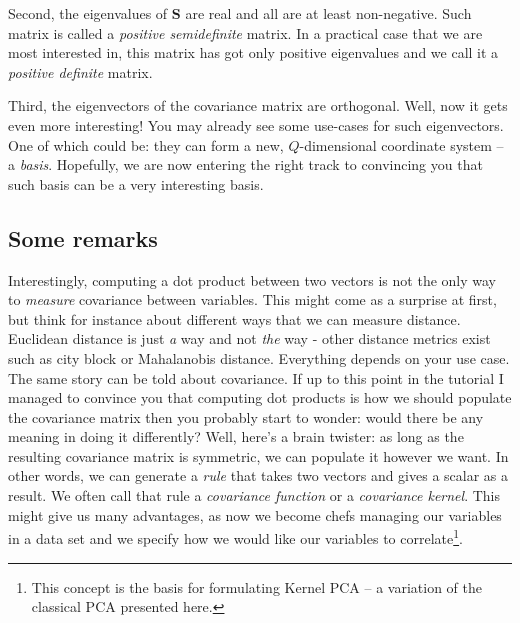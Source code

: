 \documentclass[10pt,twocolumn]{article}
\begin{document}
Second, the eigenvalues of $\mathbf{S}$ are real and all are at least non-negative. Such matrix is called a \textit{positive semidefinite} matrix. In a practical case that we are most interested in, this matrix has got only positive eigenvalues and we call it a \textit{positive definite} matrix.

Third, the eigenvectors of the covariance matrix are orthogonal. Well, now it gets even more interesting! You may already see some use-cases for such eigenvectors. One of which could be: they can form a new, $Q$-dimensional coordinate system -- a \textit{basis}. 
Hopefully, we are now entering the right track to convincing you that such basis can be a very interesting basis.


\subsection{Some remarks}

Interestingly, computing a dot product between two vectors is not the only way to \textit{measure} covariance between variables. This might come as a surprise at first, but think for instance about different ways that we can measure distance. Euclidean distance is just \textit{a} way and not \textit{the} way - other distance metrics exist such as city block or Mahalanobis distance. Everything depends on your use case. The same story can be told about covariance. If up to this point in the tutorial I managed to convince you that computing dot products is how we should populate the covariance matrix then you probably start to wonder: would there be any meaning in doing it differently? Well, here's a brain twister: as long as the resulting covariance matrix is symmetric, we can populate it however we want. In other words, we can generate a \textit{rule} that takes two vectors and gives a scalar as a result. We often call that rule a \textit{covariance function} or a \textit{covariance kernel}. This might give us many advantages, as now we become chefs managing our variables in a data set and we specify how we would like our variables to correlate\footnote{This concept is the basis for formulating Kernel PCA -- a variation of the classical PCA presented here.}.

\end{document}
